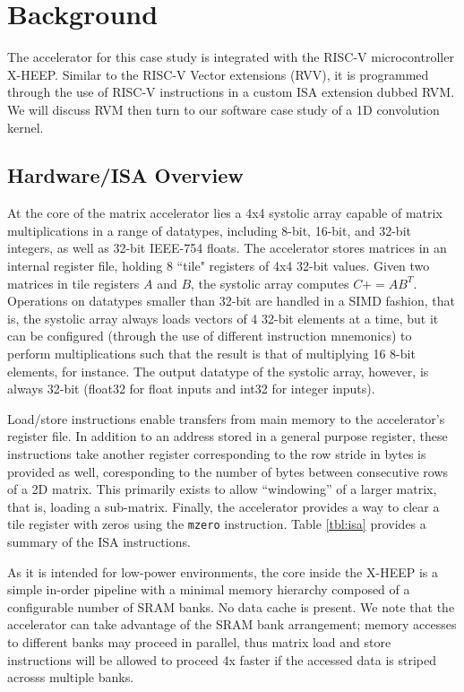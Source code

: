 \documentclass[acmsmall, nonacm=true]{acmart}
\newcommand{\pluseq}{\mathrel{{+}{=}}}
\begin{document}
\section{Background}

The accelerator for this case study is integrated with the RISC-V microcontroller X-HEEP\cite{x_heep}. Similar to the RISC-V Vector extensions (RVV), it is programmed through the use of RISC-V instructions in a custom ISA extension dubbed RVM. We will discuss RVM then turn to our software case study of a 1D convolution kernel.

\subsection{Hardware/ISA Overview}

At the core of the matrix accelerator lies a 4x4 systolic array capable of matrix multiplications in a range of datatypes, including 8-bit, 16-bit, and 32-bit integers, as well as 32-bit IEEE-754 floats. The accelerator stores matrices in an internal register file, holding 8 ``tile" registers of 4x4 32-bit values. Given two matrices in tile registers $A$ and $B$, the systolic array computes $C \pluseq AB^T$. Operations on datatypes smaller than 32-bit are handled in a SIMD fashion, that is, the systolic array always loads vectors of 4 32-bit elements at a time, but it can be configured (through the use of different instruction mnemonics) to perform multiplications such that the result is that of multiplying 16 8-bit elements, for instance. The output datatype of the systolic array, however, is always 32-bit (float32 for float inputs and int32 for integer inputs).

Load/store instructions enable transfers from main memory to the accelerator's register file. In addition to an address stored in a general purpose register, these instructions take another register corresponding to the row stride in bytes is provided as well, coresponding to the number of bytes between consecutive rows of a 2D matrix. 
This primarily exists to allow ``windowing'' of a larger matrix, that is, loading a sub-matrix.
Finally, the accelerator provides a way to clear a tile register with zeros using the \verb|mzero| instruction. Table \ref{tbl:isa} provides a summary of the ISA instructions.

As it is intended for low-power environments, the core inside the X-HEEP is a simple in-order pipeline with a minimal memory hierarchy composed of a configurable number of SRAM banks. No data cache is present. We note that the accelerator can take advantage of the SRAM bank arrangement; memory accesses to different banks may proceed in parallel, thus matrix load and store instructions will be allowed to proceed 4x faster if the accessed data is striped acrosss multiple banks.
\end{document}
